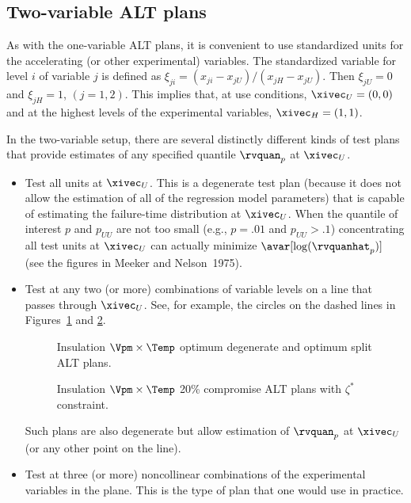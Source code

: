 \subsection{Two-variable ALT plans}

As with the one-variable ALT plans, it is convenient to use
standardized units for the accelerating (or other experimental)
variables.  The standardized variable for level $i$ of variable $j$
is defined as $\xi_{ji}=(x_{ji}-x_{jU})/(x_{jH}-x_{jU})$.  Then
$\xi_{jU}=0$ and $\xi_{jH}=1$, $(j=1,2)$. This implies that, at use
conditions, $\xivec_{U}=(0,0)$ and at the highest levels of the
experimental variables, $\xivec_{H}=(1,1)$.

In the two-variable setup, there are several distinctly different kinds
of test plans that provide estimates of any specified
quantile $\rvquan_{p}$ at $\xivec_{U}$.
\begin{itemize}
\item
Test all units at $ \xivec_{U}$.  This is a degenerate test plan
(because it does not allow the estimation of all of the regression
model parameters) that is capable of estimating the failure-time
distribution at $\xivec_{U}$.  When the quantile of interest $p$ and
$p_{UU}$ are not too small (e.g., $p=.01$ and $p_{UU} > .1$)
concentrating all test units at $ \xivec_{U}$ can actually minimize
$\avar[\log(\rvquanhat_{p})]$ (see the figures in Meeker and
Nelson~1975).
\item
Test at any two (or more) combinations of variable levels on a line that
passes through $\xivec_{U}$. See, for example, the circles on the
dashed lines in Figures~\ref{figure:insul.vpm.temp.opt.ps} and
\ref{figure:insul.vpm.temp.20perct.zeta.ps}.
\begin{figure}
\caption{Insulation $\Vpm \times \Temp$  optimum 
degenerate and optimum split ALT plans.}
\label{figure:insul.vpm.temp.opt.ps}
\end{figure}
\begin{figure}
\caption{Insulation
$\Vpm \times \Temp$ 20\% compromise ALT plans with $\zeta^{*}$
constraint.}
\label{figure:insul.vpm.temp.20perct.zeta.ps}
\end{figure}
Such plans are also degenerate but allow estimation of $\rvquan_{p}$ at
$\xivec_{U}$ (or any other point on the line). 

\item
Test at three (or more) noncollinear combinations of the experimental
variables in the plane. This is the type of plan that one would use in
practice.
\end{itemize}

